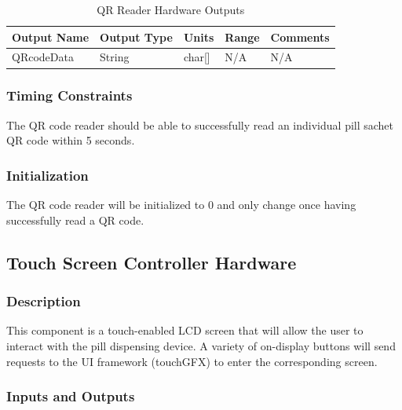 \documentclass[12pt,titlepage]{article}
\begin{document}
\begin{table}[ht!]
\begin{center}
\begin{adjustbox}{max width=\textwidth}
\small
\begin{tabular}{|p{}|p{}|p{}|p{}|p{}|}
 \hline
 \textbf{Output Name} & \textbf{Output Type} & \textbf{Units} &\textbf{Range} & \textbf{Comments} \\
 \hline 
 QRcodeData & String & char[] & N/A & N/A \\
 \hline
\end{tabular}
\end{adjustbox}
\end{center}
\caption{QR Reader Hardware Outputs}
\end{table}

\subsubsection*{Timing Constraints}
The QR code reader should be able to successfully read an individual pill sachet QR code within 5 seconds.
\subsubsection*{Initialization}
The QR code reader will be initialized to 0 and only change once having successfully read a QR code.
\subsection{Touch Screen Controller Hardware}
\subsubsection*{Description}
This component is a touch-enabled LCD screen that will allow the user to interact with the pill dispensing device. A variety of on-display buttons will send requests to the UI framework (touchGFX) to enter the corresponding screen.
\subsubsection*{Inputs and Outputs}
\end{document}
